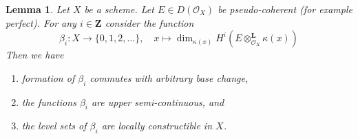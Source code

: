\documentclass{stacks-project}
\theoremstyle{plain}
\newtheorem{lemma}[subsection]{Lemma}
\theoremstyle{definition}
\theoremstyle{remark}
\numberwithin{equation}{subsection}
\begin{document}
\begin{lemma}
\label{lemma-jump-loci}
Let $X$ be a scheme. Let $E \in D(\mathcal{O}_X)$ be pseudo-coherent
(for example perfect). For any $i \in \mathbf{Z}$ consider the function
$$
\beta_i : X \longrightarrow \{0, 1, 2, \ldots\},\quad
x \longmapsto
\dim_{\kappa(x)}
H^i(E \otimes_{\mathcal{O}_X}^\mathbf{L} \kappa(x))
$$
Then we have
\begin{enumerate}
\item formation of $\beta_i$ commutes with arbitrary base change,
\item the functions $\beta_i$ are upper semi-continuous, and
\item the level sets of $\beta_i$ are locally constructible in $X$.
\end{enumerate}
\end{lemma}
\end{document}
